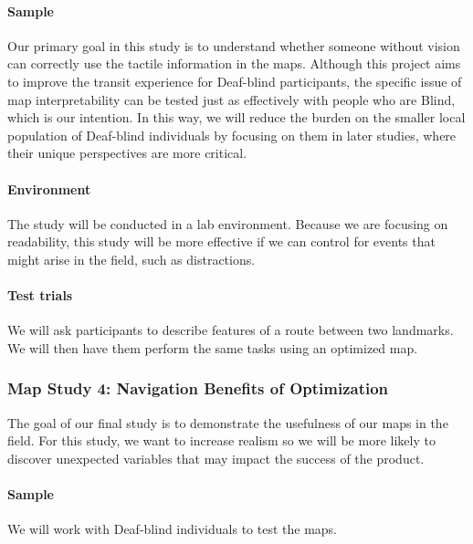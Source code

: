 \paragraph{Sample}
Our primary goal in this study is to understand whether someone without vision can correctly use the tactile information in the maps. Although this project aims to improve the transit experience for Deaf-blind participants, the specific issue of map interpretability can be tested just as effectively with people who are Blind, which is our intention. In this way, we will reduce the burden on the smaller local population of Deaf-blind individuals by focusing on them in later studies, where their unique perspectives are more critical.

\paragraph{Environment}
The study will be conducted in a lab environment. Because we are focusing on readability, this study will be more effective if we can control for events that might arise in the field, such as distractions.

\paragraph{Test trials}
We will ask participants to describe features of a route between two landmarks. We will then have them perform the same tasks using an optimized map. 



\subsubsection{Map Study 4: Navigation Benefits of Optimization}
\label{sec:field-map}
The goal of our final study is to demonstrate the usefulness of our maps in the field. For this study, we want to increase realism so we will be more likely to discover unexpected variables that may impact the success of the product. 

\paragraph{Sample}
We will work with Deaf-blind individuals to test the maps. 


